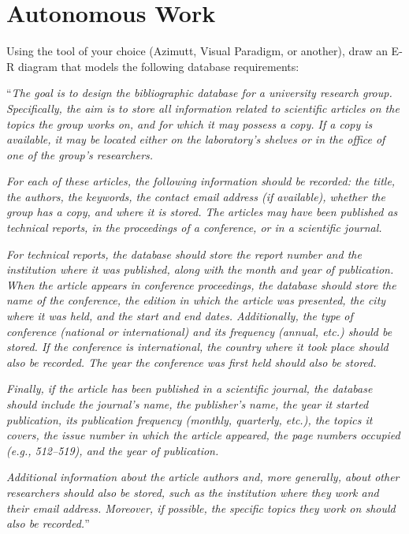 \documentclass{article}
\begin{document}
\section{Autonomous Work} \label{sec:work}
Using the tool of your choice (Azimutt, Visual Paradigm, or another), draw an E-R diagram that models the following database requirements:

``\textit{The goal is to design the bibliographic database for a university research group. Specifically, the aim is to store all information related to scientific articles on the topics the group works on, and for which it may possess a copy. If a copy is available, it may be located either on the laboratory’s shelves or in the office of one of the group’s researchers.}

\textit{For each of these articles, the following information should be recorded: the title, the authors, the keywords, the contact email address (if available), whether the group has a copy, and where it is stored. The articles may have been published as technical reports, in the proceedings of a conference, or in a scientific journal.}

\textit{For technical reports, the database should store the report number and the institution where it was published, along with the month and year of publication. When the article appears in conference proceedings, the database should store the name of the conference, the edition in which the article was presented, the city where it was held, and the start and end dates. Additionally, the type of conference (national or international) and its frequency (annual, etc.) should be stored. If the conference is international, the country where it took place should also be recorded. The year the conference was first held should also be stored.}

\textit{Finally, if the article has been published in a scientific journal, the database should include the journal’s name, the publisher’s name, the year it started publication, its publication frequency (monthly, quarterly, etc.), the topics it covers, the issue number in which the article appeared, the page numbers occupied (e.g., 512–519), and the year of publication.}

\textit{Additional information about the article authors and, more generally, about other researchers should also be stored, such as the institution where they work and their email address. Moreover, if possible, the specific topics they work on should also be recorded.}''
\end{document}
